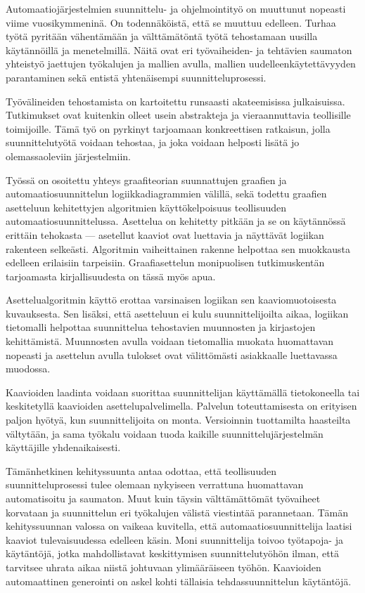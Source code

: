 \documentclass[finnish,12pt]{article}
\begin{document}
Automaatiojärjestelmien suunnittelu- ja ohjelmointityö on muuttunut nopeasti viime vuosikymmeninä. On todennäköistä, että se muuttuu edelleen.
Turhaa työtä pyritään vähentämään ja välttämätöntä työtä tehostamaan uusilla käytännöillä ja menetelmillä.
Näitä ovat eri työvaiheiden- ja tehtävien saumaton yhteistyö jaettujen työkalujen ja mallien avulla, mallien uudelleenkäytettävyyden parantaminen sekä entistä yhtenäisempi suunnitteluprosessi.

Työvälineiden tehostamista on  kartoitettu runsaasti akateemisissa julkaisuissa.
Tutkimukset ovat kuitenkin olleet usein abstrakteja ja vieraannuttavia teollisille toimijoille.
Tämä työ on pyrkinyt tarjoamaan konkreettisen ratkaisun, jolla suunnittelutyötä voidaan tehostaa, ja joka voidaan helposti lisätä jo olemassaoleviin järjestelmiin.

Työssä on osoitettu yhteys graafiteorian suunnattujen graafien ja automaatiosuunnittelun logiikkadiagrammien välillä, sekä todettu graafien asetteluun kehitettyjen algoritmien käyttökelpoisuus teollisuuden automaatiosuunnittelussa.
Asettelua on kehitetty pitkään ja se on käytännössä erittäin tehokasta --- asetellut kaaviot ovat luettavia ja näyttävät logiikan rakenteen selkeästi.
Algoritmin vaiheittainen rakenne helpottaa sen muokkausta edelleen erilaisiin tarpeisiin.
Graafiasettelun monipuolisen tutkimuskentän tarjoamasta kirjallisuudesta on tässä myös apua.

Asettelualgoritmin käyttö erottaa varsinaisen logiikan sen kaaviomuotoisesta kuvauksesta.
Sen lisäksi, että asetteluun ei kulu suunnittelijoilta aikaa, logiikan tietomalli helpottaa suunnittelua tehostavien muunnosten ja kirjastojen kehittämistä.
Muunnosten avulla voidaan tietomallia muokata huomattavan nopeasti ja asettelun avulla tulokset ovat välittömästi asiakkaalle luettavassa muodossa.

Kaavioiden laadinta voidaan suorittaa suunnittelijan käyttämällä tietokoneella tai keskitetyllä kaavioiden asettelupalvelimella.
Palvelun toteuttamisesta on erityisen paljon hyötyä, kun suunnittelijoita on monta.
Versioinnin tuottamilta haasteilta vältytään, ja sama työkalu voidaan tuoda kaikille suunnittelujärjestelmän käyttäjille yhdenaikaisesti.

Tämänhetkinen kehityssuunta antaa odottaa, että teollisuuden suunnitteluprosessi tulee olemaan nykyiseen verrattuna huomattavan automatisoitu ja saumaton.
Muut kuin täysin välttämättömät työvaiheet korvataan ja suunnittelun eri työkalujen välistä viestintää parannetaan.
Tämän kehityssuunnan valossa on vaikeaa kuvitella, että automaatiosuunnittelija laatisi kaaviot tulevaisuudessa edelleen käsin.
Moni suunnittelija toivoo työtapoja- ja käytäntöjä, jotka mahdollistavat keskittymisen suunnittelutyöhön ilman, että tarvitsee uhrata aikaa niistä johtuvaan ylimääräiseen työhön.
Kaavioiden automaattinen generointi on askel kohti tällaisia tehdassuunnittelun käytäntöjä.

\clearpage
{}


\end{document}
